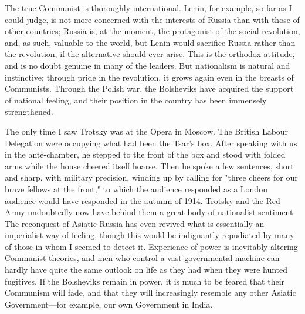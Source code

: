 The true Communist is thoroughly international. Lenin, for example, so far as I could judge, is not more concerned with the interests of Russia than with those of other countries; Russia is, at the moment, the protagonist of the social revolution, and, as such, valuable to the world, but Lenin would sacrifice Russia rather than the revolution, if the alternative should ever arise. This is the orthodox attitude, and is no doubt genuine in many of the leaders. But nationalism is natural and instinctive; through pride in the revolution, it grows again even in the breasts of Communists. Through the Polish war, the Bolsheviks have acquired the support of national feeling, and their position in the country has been immensely strengthened.

The only time I saw Trotsky was at the Opera in Moscow. The British Labour Delegation were occupying what had been the Tsar's box. After speaking with us in the ante-chamber, he stepped to the front of the box and stood with folded arms while the house cheered itself hoarse. Then he spoke a few sentences, short and sharp, with military precision, winding up by calling for "three cheers for our brave fellows at the front," to which the audience responded as a London audience would have responded in the autumn of 1914. Trotsky and the Red Army undoubtedly now have behind them a great body of nationalist sentiment. The reconquest of Asiatic Russia has even revived what is essentially an imperialist way of feeling, though this would be indignantly repudiated by many of those in whom I seemed to detect it. Experience of power is inevitably altering Communist theories, and men who control a vast governmental machine can hardly have quite the same outlook on life as they had when they were hunted fugitives. If the Bolsheviks remain in power, it is much to be feared that their Communism will fade, and that they will increasingly resemble any other Asiatic Government---for example, our own Government in India.